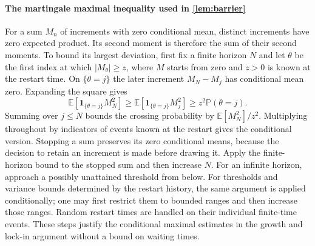 \paragraph{The martingale maximal inequality used in \autoref{lem:barrier}}
\label{app: martingale bound}
For a sum $M_n$ of increments with zero conditional mean, distinct increments have zero expected product. Its second moment is therefore the sum of their second moments. To bound its largest deviation, first fix a finite horizon $N$ and let $\theta$ be the first index at which $|M_\theta|\ge z$, where $M$ starts from zero and $z>0$ is known at the restart time.
On $\{\theta=j\}$ the later increment $M_N-M_j$ has conditional mean zero. Expanding the square gives
\[
\mathbb E[\mathbf1_{\{\theta=j\}}M_N^2]
\ge \mathbb E[\mathbf1_{\{\theta=j\}}M_j^2]
\ge z^2\mathbb P(\theta=j).
\]
Summing over $j\le N$ bounds the crossing probability by $\mathbb E[M_N^2]/z^2$.
Multiplying throughout by indicators of events known at the restart gives the conditional version. Stopping a sum preserves its zero conditional means, because the decision to retain an increment is made before drawing it. Apply the finite-horizon bound to the stopped sum and then increase $N$. For an infinite horizon, approach a possibly unattained threshold from below. For thresholds and variance bounds determined by the restart history, the same argument is applied conditionally; one may first restrict them to bounded ranges and then increase those ranges. Random restart times are handled on their individual finite-time events. These steps justify the conditional maximal estimates in the growth and lock-in argument without a bound on waiting times.
